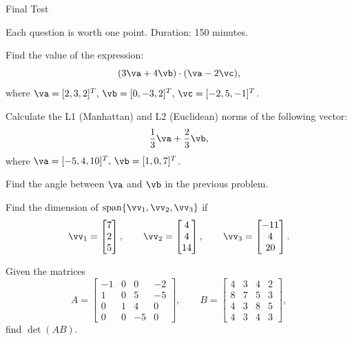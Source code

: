  \begin{center}\begin{large} Final Test
 \vspace{1em}
 
 \end{large}\end{center}
 \small Each question is worth one point. Duration: 150 minutes.
 \bigskip

 
\begin{problem}
Find the value of the expression:
\[ (3\va+4\vb)\cdot (\va-2\vc), \]
where $\va=[2, 3, 2]^T,\,\vb=[0, -3, 2]^T,\,\vc=[-2, 5, -1]^T$.
\end{problem}
\medskip

\begin{problem}
Calculate the L1 (Manhattan) and L2 (Euclidean) norms of the following vector:
\[ \dfrac{1}{3}\va+\dfrac{2}{3}\vb, \]
where $\va=[-5,4,10]^T,\,\vb=[1,0,7]^T$.
\end{problem}
\medskip

\begin{problem}
Find the angle between $\va$ and $\vb$ in the previous problem.
\end{problem}
\medskip

\begin{problem}
Find the dimension of $\operatorname{span}\{\vv_1,\vv_2,\vv_3\}$ if
\[
\vv_1 = \begin{bmatrix}
    7 \\ 2 \\ 5
\end{bmatrix},
\qquad
\vv_2 = \begin{bmatrix}
    4 \\ 4 \\ 14
\end{bmatrix},
\qquad
\vv_3 = \begin{bmatrix}
    -11 \\ 4 \\ 20
\end{bmatrix}.
\]
\end{problem}
\medskip

\begin{problem}
Given the matrices
\[ A = \begin{bmatrix}
-1&0&0&-2\\1&0&5&-5\\0&1&4&0\\0&0&-5&0
\end{bmatrix},\qquad B = \begin{bmatrix}
4&3&4&2\\8&7&5&3\\4&3&8&5\\4&3&4&3
\end{bmatrix}, \]
find $\det(AB)$.
\end{problem}
\medskip

